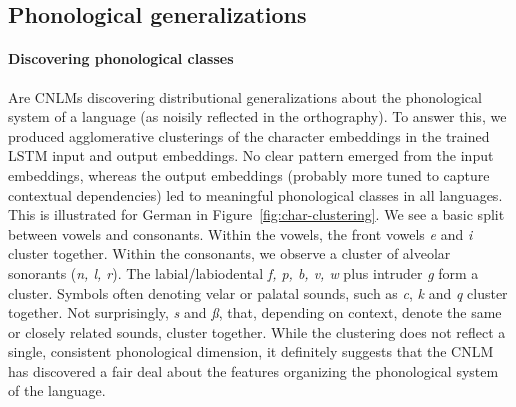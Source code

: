 
\subsection{Phonological generalizations}

\paragraph{Discovering phonological classes} Are CNLMs discovering distributional
generalizations about the phonological system of a language (as
noisily reflected in the orthography). To answer this, we
produced agglomerative clusterings of the character embeddings in the
trained LSTM  input and output embeddings. No clear pattern
emerged from the input embeddings, whereas the output
embeddings (probably more tuned to capture contextual dependencies)
led to meaningful phonological classes in all languages. This is illustrated for
German in Figure~\ref{fig:char-clustering}. We see a basic split
between vowels and consonants. Within the vowels, the front vowels
\emph{e} and \emph{i} cluster together. Within the consonants, we
observe a cluster of alveolar sonorants (\emph{n, l, r}). The
labial/labiodental \emph{f, p, b, v, w} plus intruder \emph{g}
form a cluster. Symbols often denoting velar or palatal sounds, such
as \emph{c}, \emph{k} and \emph{q} cluster together. Not surprisingly,
\emph{s} and \emph{{\ss}}, that, depending on context, denote the same
or closely related sounds, cluster together. While the
 clustering does not reflect a single,
consistent phonological dimension, it definitely suggests that the
CNLM has discovered a fair deal about the features organizing the
phonological system of the language.




